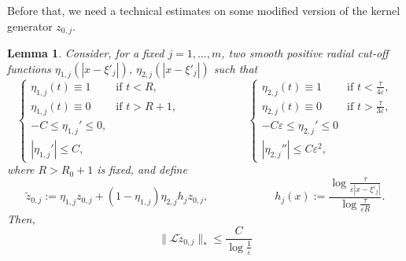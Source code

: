 \documentclass[11pt]{article}
\newtheorem{lemma}{Lemma}[section]
\begin{document}
Before that, we need a technical estimates on some modified version of the kernel generator $z_{0,j}$.

\begin{lemma}\label{ltildez0j}
Consider, for a fixed $j=1,\dots,m$, two smooth positive radial cut-off functions $\eta_{1,j}\left(\left|x-\xi'_j\right|\right)$, $\eta_{2,j}\left(\left|x-\xi'_j\right|\right)$ such that
\begin{equation}\label{eta12}
\left\{\begin{array}{ll}\eta_{1,j}(t)\equiv1&\mbox{if }t<R,\\\eta_{1,j}(t)\equiv0&\mbox{if }t>R+1,\\-C\le\eta_{1,j}'\le0,\\\left|\eta_{1,j}'\right|\le C,\end{array}\right.\qquad\qquad\qquad\left\{\begin{array}{ll}\eta_{2,j}(t)\equiv1&\mbox{if }t<\frac\tau{4\varepsilon},\\\eta_{2,j}(t)\equiv0&\mbox{if }t>\frac\tau{3\varepsilon},\\-C\varepsilon\le\eta_{2,j}'\le0\\\left|\eta_{2,j}''\right|\le C\varepsilon^2,\end{array}\right.
\end{equation}
where $R>R_0+1$ is fixed, and define
$$\widetilde z_{0,j}:=\eta_{1,j}z_{0,j}+(1-\eta_{1,j})\eta_{2,j}h_j z_{0,j},\qquad\qquad\qquad h_j(x):=\frac{\log\frac\tau{\varepsilon\left|x-\xi'_j\right|}}{\log\frac\tau{\varepsilon R}}.$$
Then,
$$\|\mathcal L\widetilde z_{0,j}\|_\ast\le\frac C{\log\frac1\varepsilon}$$
\end{lemma}
\end{document}
